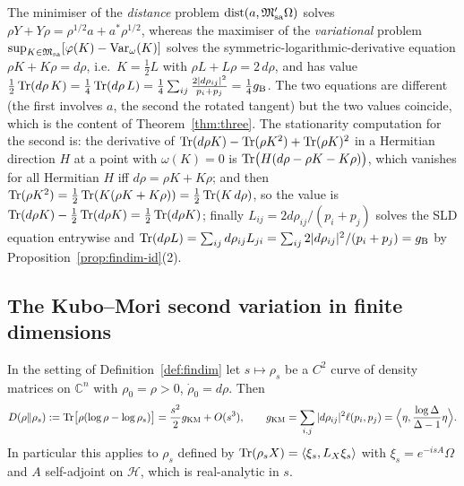 \documentclass[11pt]{article}
\newcommand{\Om}{\Omega}
\newcommand{\Hil}{\mathcal H}
\newcommand{\Msa}{\cM_{\mathrm{sa}}}
\newcommand{\Mpsa}{\cM'_{\mathrm{sa}}}
\newcommand{\Var}{\operatorname{Var}}
\newcommand{\dist}{\operatorname{dist}}
\newcommand{\gB}{g_{\mathrm B}}
\newcommand{\gKM}{g_{\mathrm{KM}}}
\newcommand{\ip}[2]{\langle #1,#2\rangle}
\begin{document}
\begin{remark}\label{rem:SLD}
The minimiser of the \emph{distance} problem $\dist(a,\Mpsa\Om)$ solves $\rho Y+Y\rho=\rho^{1/2}a+a^*\rho^{1/2}$,
whereas the maximiser of the \emph{variational} problem $\sup_{K\in\Msa}[\varphi(K)-\Var_\omega(K)]$ solves the
symmetric-logarithmic-derivative equation $\rho K+K\rho=d\rho$, i.e.\ $K=\tfrac12L$ with $\rho L+L\rho=2\,d\rho$,
and has value $\tfrac12\Tr(d\rho\,K)=\tfrac14\Tr(d\rho\,L)=\tfrac14\sum_{ij}\frac{2|d\rho_{ij}|^2}{p_i+p_j}
=\tfrac14\gB$.  The two equations are different (the first involves $a$, the second the rotated tangent) but the two
values coincide, which is the content of Theorem~\ref{thm:three}.  The stationarity computation for the second is:
the derivative of $\operatorname{Tr}(d\rho K)-\operatorname{Tr}(\rho K^2)+\operatorname{Tr}(\rho K)^2$ in a Hermitian direction $H$ at a point with
$\omega(K)=0$ is $\operatorname{Tr}\bigl(H(d\rho-\rho K-K\rho)\bigr)$, which vanishes for all Hermitian $H$ iff
$d\rho=\rho K+K\rho$; and then $\operatorname{Tr}(\rho K^2)=\tfrac12\operatorname{Tr}(K(\rho K+K\rho))=\tfrac12\operatorname{Tr}(K\,d\rho)$, so the value is
$\operatorname{Tr}(d\rho K)-\tfrac12\operatorname{Tr}(d\rho K)=\tfrac12\operatorname{Tr}(d\rho K)$; finally $L_{ij}=2d\rho_{ij}/(p_i+p_j)$ solves the SLD
equation entrywise and $\Tr(d\rho L)=\sum_{ij}d\rho_{ij}L_{ji}=\sum_{ij}2|d\rho_{ij}|^2/(p_i+p_j)=\gB$
by Proposition~\ref{prop:findim-id}(2).
\end{remark}

\subsection{The Kubo--Mori second variation in finite dimensions}\label{sec:KM}

\begin{proposition}\label{prop:KM}
In the setting of Definition~\ref{def:findim} let $s\mapsto\rho_s$ be a $C^2$ curve of density matrices on
$\mathbb C^n$ with $\rho_0=\rho>0$, $\dot\rho_0=d\rho$.  Then
\begin{equation}\label{eq:KM-expansion}
 D(\rho\Vert\rho_s):=\Tr\bigl[\rho(\log\rho-\log\rho_s)\bigr]=\frac{s^2}{2}\gKM+O(s^3),\qquad
 \gKM=\sum_{i,j}|d\rho_{ij}|^2\ell(p_i,p_j)=\Bigl\langle\eta,\frac{\log\Delta}{\Delta-1}\eta\Bigr\rangle .
\end{equation}
In particular this applies to $\rho_s$ defined by $\Tr(\rho_sX)=\ip{\xi_s}{L_X\xi_s}$ with $\xi_s=e^{-isA}\Om$
and $A$ self-adjoint on $\Hil$, which is real-analytic in $s$.
\end{proposition}
\end{document}
